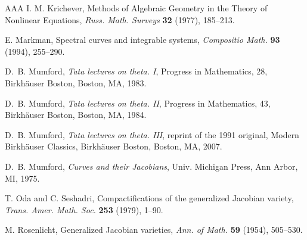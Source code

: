 \documentclass[12pt,reqno]{amsart}
\numberwithin{equation}{section}
\theoremstyle{definition}
\theoremstyle{remark}
\begin{document}
\begin{thebibliography}{AAA}
 I. M. Krichever, Methods of Algebraic Geometry in the Theory of Nonlinear
Equations, {\it Russ. Math. Surveys} {\bf 32} (1977), 185--213.

 E. Markman, Spectral curves and integrable systems, \textit{Compositio Math.}
\textbf{93} (1994), 255--290.
 
 D.~B. Mumford, {\it Tata lectures on theta. I}, Progress in Mathematics, 28, Birkh\"auser Boston, Boston, MA, 1983.

D.~B. Mumford, {\it Tata lectures on theta. II}, Progress in Mathematics, 43, Birkh\"auser Boston, Boston, MA, 1984.

D.~B. Mumford, {\it Tata lectures on theta. III}, reprint of the 1991 original, 
Modern Birkh\"auser Classics, Birkh\"auser Boston, Boston, MA, 2007.

 D.~B. Mumford, {\it Curves and their Jacobians}, Univ. Michigan Press, Ann Arbor, MI, 1975.
 
 T. Oda and C. Seshadri, Compactifications of the generalized Jacobian variety,
\textit{Trans. Amer. Math. Soc.} {\bf 253} (1979), 1--90.

 M. Rosenlicht, Generalized Jacobian varieties, {\it Ann. of Math.} {\bf 59} (1954), 505--530.

\end{thebibliography}
\end{document}
